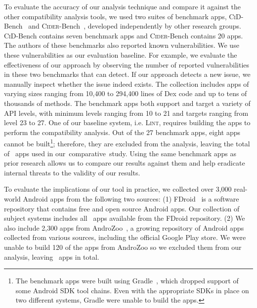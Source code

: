 To evaluate the accuracy of our analysis technique and
compare it against the other compatibility analysis
tools, we used two suites of benchmark apps,
\textsc{CiD}-Bench~\cite{lili2018cid} and
\textsc{Cider}-Bench~\cite{huang2018understanding},
developed independently by other research groups.
%
\textsc{CiD}-Bench contains seven benchmark apps and
\textsc{Cider}-Bench contains 20 apps.  The authors of
these benchmarks also reported known vulnerabilities.
We use these vulnerabilities as our evaluation
baseline. For example, we evaluate the effectiveness of
our approach by observing the number of reported
vulnerabilities in these two benchmarks that \@approach
can detect. If our approach detects a new issue, we
manually inspect whether the issue indeed exists.  
%
The collection includes apps of varying sizes ranging
from 10,400 to 294,400 lines of Dex code and up to tens
of thousands of methods. The benchmark apps both
support and target a variety of API levels, with
minimum levels ranging from 10 to 21 and targets
ranging from level 23 to 27.  One of our baseline
system, i.e. \textsc{Lint}, requires building the apps
to perform the compatibility analysis. Out of the 27
benchmark apps, eight apps cannot be built\footnote{The
benchmark apps were built using Gradle~\cite{Gradle},
which dropped support of some Android SDK tool chains.
Even with the appropriate SDKs in place on two
different systems, Gradle were unable to build the
apps.}; therefore, they are excluded from the analysis,
leaving the total of \rqoneapps~apps used in
our~comparative~study.  Using the same benchmark apps
as prior research allows us to compare our results
against them and help eradicate internal threats to the
validity of our results.

To evaluate the implications of our tool in practice, we collected over 3,000 real-world Android apps from the following two sources:
(1) FDroid~\cite{fdroid} is a software
repository that contains free and open source Android
apps.  Our collection of subject systems includes all
\fdroidct\ apps available from the FDroid repository. 
(2) We also include 2,300 apps from AndroZoo~\cite{allix2016androzoo}, a growing repository of Android apps
collected from various sources, including the official Google Play store. We were
unable to build 120 of the apps from AndroZoo so we
excluded them from our analysis, leaving \apptotal~apps
in total.

